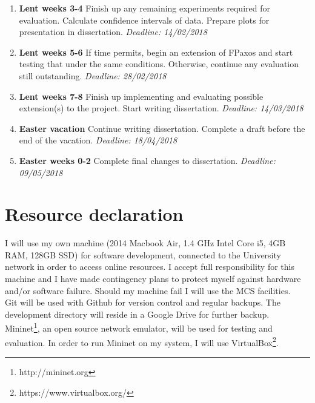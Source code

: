 \begin{enumerate}
  \item {\bf{}Lent weeks 3-4} Finish up any remaining experiments required for evaluation. Calculate confidence intervals of data. Prepare plots for presentation in dissertation.{\em{} Deadline: 14/02/2018}
  
    \item {\bf{}Lent weeks 5-6} If time permits, begin an extension of FPaxos and start testing that under the same conditions. Otherwise, continue any evaluation still outstanding.{\em{} Deadline: 28/02/2018}

  \item {\bf{}Lent weeks 7-8} Finish up implementing and evaluating possible extension(s) to the project. Start writing dissertation.{\em{} Deadline: 14/03/2018}
  
  \item {\bf{}Easter vacation} Continue writing dissertation. Complete a draft before the end of the vacation.{\em{} Deadline: 18/04/2018}
  
  \item {\bf{}Easter weeks 0-2} Complete final changes to dissertation.{\em{} Deadline: 09/05/2018}
\end{enumerate}

\section*{Resource declaration}
I will use my own machine (2014 Macbook Air, 1.4 GHz Intel Core i5, 4GB RAM, 128GB SSD) for software development, connected to the University network in order to access online resources. I accept full responsibility for this machine and I have made contingency plans to protect myself against hardware and/or software failure. Should my machine fail I will use the MCS facilities.  \\

Git will be used with Github for version control and regular backups. The development directory will reside in a Google Drive for further backup. \\

Mininet\footnote{http://mininet.org}, an open source network emulator, will be used for testing and evaluation. In order to run Mininet on my system, I will use VirtualBox\footnote{https://www.virtualbox.org/}. \\